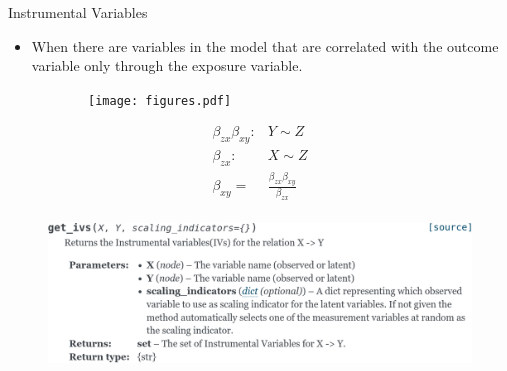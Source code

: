 \documentclass{beamer}
\begin{document}
\begin{frame}{Instrumental Variables}
	\begin{itemize}
		\item When there are variables in the model that are correlated
			with the outcome variable only through the exposure
			variable.
	\end{itemize}
	\begin{figure}
		\begin{subfigure}{0.5 \textwidth}
			\centering
			\texttt{[image: figures.pdf]}
		\end{subfigure}%
		\begin{subfigure}{0.5 \textwidth}
			\begin{equation*}
				\begin{split}
					\beta_{zx} \beta_{xy}:& Y \sim Z \\
					\beta_{zx}:& X \sim Z \\
					\beta_{xy} =& \frac{\beta_{zx}\beta_{xy}}{\beta_{zx}} \\
				\end{split}
			\end{equation*}
		\end{subfigure}
	\end{figure}

	\begin{figure}
		\centering
		\includegraphics[scale=0.25]{imgs/ivs.png}
	\end{figure}
\end{frame}
\end{document}
